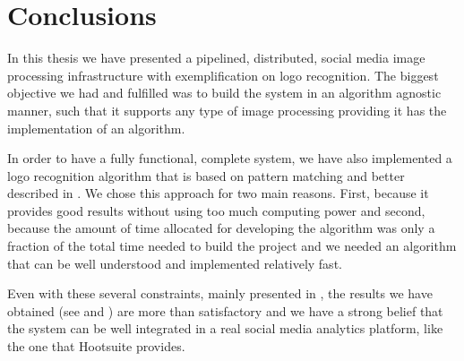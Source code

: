 \chapter{Conclusions}

In this thesis we have presented a pipelined, distributed, social media image
processing infrastructure with exemplification on logo recognition. The
biggest objective we had and fulfilled was to build the system in an
algorithm agnostic manner, such that it supports any type of image processing
providing it has the implementation of an algorithm.

In order to have a fully functional, complete system, we have also implemented
a logo recognition algorithm that is based on pattern matching and better
described in . We chose this
approach for two main reasons. First, because it provides good results without
using too much computing power and second, because the amount of time
allocated for developing the algorithm was only a fraction of the total
time needed to build the project and we needed an algorithm that can be well
understood and implemented relatively fast.

Even with these several constraints, mainly presented in
, the results we have obtained (see  and
) are more than satisfactory and
we have a strong belief that the system can be well integrated in a real social media
analytics platform, like the one that Hootsuite provides.
